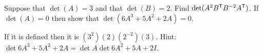 
\begin{Exercise}[
name={},
title={}, 
difficulty=0,
origin={\cite{JH}}]
\Question Suppose that \( \det(A)=3 \) and that \( \det(B)=2 \).
Find \( \det(A^2{{B}^{\mathsf{T}}}B^{-2}{{A}^{\mathsf{T}}} ) \).
\Question If \( \det(A)=0 \) then show that \( \det(6A^3+5A^2+2A)=0 \).
\end{Exercise}

\begin{Answer}
\Question If it is defined then it is \( (3^2)(2) (2^{-2}) (3) \).
\Question Hint: \( \det{6A^3+5A^2+2A}=\det{A}\det{6A^2+5A+2I} \).
\end{Answer}
